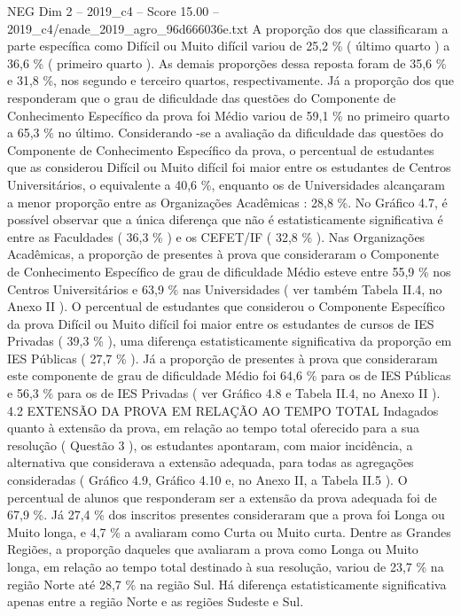 \begin{textsample}{NEG Dim 2 – 2019\_c4 – Score 15.00 – 2019\_c4/enade\_2019\_agro\_96d666036e.txt}
A proporção dos que classificaram a parte específica como Difícil ou Muito difícil variou de 25,2 \% ( último quarto ) a 36,6 \% ( primeiro quarto ).
As demais proporções dessa reposta foram de 35,6 \% e 31,8 \%, nos segundo e terceiro quartos, respectivamente.
Já a proporção dos que responderam que o grau de dificuldade das questões do Componente de Conhecimento Específico da prova foi Médio variou de 59,1 \% no primeiro quarto a 65,3 \% no último.
Considerando -se a avaliação da dificuldade das questões do Componente de Conhecimento Específico da prova, o percentual de estudantes que as considerou Difícil ou Muito difícil foi maior entre os estudantes de Centros Universitários, o equivalente a 40,6 \%, enquanto os de Universidades alcançaram a menor proporção entre as Organizações Acadêmicas : 28,8 \%.
No Gráfico 4.7, é possível observar que a única diferença que não é estatisticamente significativa é entre as Faculdades ( 36,3 \% ) e os CEFET/IF ( 32,8 \% ).
Nas Organizações Acadêmicas, a proporção de presentes à prova que consideraram o Componente de Conhecimento Específico de grau de dificuldade Médio esteve entre 55,9 \% nos Centros Universitários e 63,9 \% nas Universidades ( ver também Tabela II.4, no Anexo II ).
O percentual de estudantes que considerou o Componente Específico da prova Difícil ou Muito difícil foi maior entre os estudantes de cursos de IES Privadas ( 39,3 \% ), uma diferença estatisticamente significativa da proporção em IES Públicas ( 27,7 \% ).
Já a proporção de presentes à prova que consideraram este componente de grau de dificuldade Médio foi 64,6 \% para os de IES Públicas e 56,3 \% para os de IES Privadas ( ver Gráfico 4.8 e Tabela II.4, no Anexo II ). 4.2 EXTENSÃO DA PROVA EM RELAÇÃO AO TEMPO TOTAL Indagados quanto à extensão da prova, em relação ao tempo total oferecido para a sua resolução ( Questão 3 ), os estudantes apontaram, com maior incidência, a alternativa que considerava a extensão adequada, para todas as agregações consideradas ( Gráfico 4.9, Gráfico 4.10 e, no Anexo II, a Tabela II.5 ).
O percentual de alunos que responderam ser a extensão da prova adequada foi de 67,9 \%.
Já 27,4 \% dos inscritos presentes consideraram que a prova foi Longa ou Muito longa, e 4,7 \% a avaliaram como Curta ou Muito curta.
Dentre as Grandes Regiões, a proporção daqueles que avaliaram a prova como Longa ou Muito longa, em relação ao tempo total destinado à sua resolução, variou de 23,7 \% na região Norte até 28,7 \% na região Sul.
Há diferença estatisticamente significativa apenas entre a região Norte e as regiões Sudeste e Sul.

\end{textsample}
